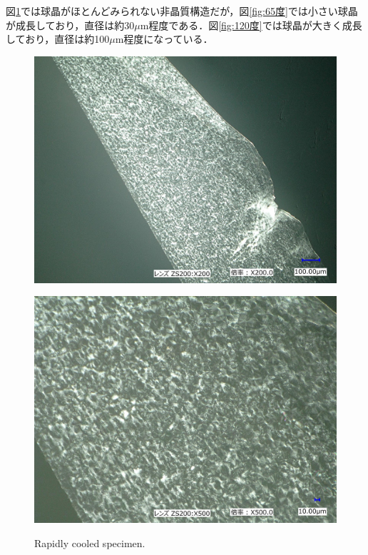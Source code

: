 図\ref{fig:rapid}では球晶がほとんどみられない非晶質構造だが，図\ref{fig:65度}では小さい球晶が成長しており，直径は約30$\mu$m程度である．図\ref{fig:120度}では球晶が大きく成長しており，直径は約100$\mu$m程度になっている．
\begin{figure}[htbp]
    \begin{minipage}[htbp]{0.45\linewidth}
      \centering
      \includegraphics[keepaspectratio, scale=0.1]{Data/観察結果/rapid_cooling_200.jpg}
      \label{fig:rapid200}
    \end{minipage}
    \begin{minipage}[htbp]{0.45\linewidth}
      \centering
      \includegraphics[keepaspectratio, scale=0.1]{Data/観察結果/rapid_cooling_500.jpg}
      \label{fig:rapid500}
    \end{minipage}
    \centering
    \caption{Rapidly cooled specimen.}
    \label{fig:rapid}
\end{figure}

